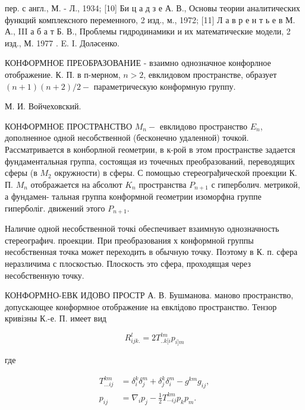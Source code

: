 \documentclass[10pt]{article}
\begin{document}
пер. с англ., М. - Л., 1934; [10] Би ц а д з е А. В., Основы теории аналитических функций комплексного переменного, 2 изд., м., 1972; [11] Л а в р е н т ь е в М. А., III а б а т Б. В., Проблемы гидродинамики и их математические модели, 2 изд., М. 1977 . E. I. Доләсенко.



КОНФОРМНОЕ ПРЕОБРАЗОВАНИЕ - взаимно однозначное конфорлное отображение. К. П. в п-мерном, $n>2$, евклидовом пространстве, образует $(n+1)(n+2) / 2-$ параметрическую конформную группу.



М. И. Войчеховский.



КОНФОРМНОЕ ПРОСТРАНСТВО $M_{n}-$ евклидово пространство $E_{n}$, дополненное одной несобственной (бесконечно удаленной) точкой. Рассматривается в конборлной геометрии, в к-рой в этом пространстве задается фундаментальная группа, состоящая из точечных преобразований, переводящих сферы (в $M_{2}$ окружности) в сферы. С помощью стереограђической проекции К. П. $M_{n}$ отображается на абсолют $K_{n}$ пространства $P_{n+1}$ с гиперболич. метрикой, а фундамен- тальная группа конформной геометрии изоморфна группе гиперболіг. движений этого $P_{n+1}$.



Наличие одной несобственной точкі обеспечивает взаимную однозначность стереографич. проекции. При преобразования х конформной группы несобственная точка может переходить в обычную точку. Поэтому в К. п. сфера неразличима с плоскостью. Плоскость это сфера, проходящая через несобственную точку.



КОНФОРМНО-ЕВК ИДОВО ПРОСТР А. В. Бушманова. маново пространство, допускающее конформное отображение на евклідово пространство. Тензор кривізны К.-е. П. имеет вид



\[

R_{i j k .}^{l}=2 T_{. . k[i}^{l m} p_{i] m}

\]



где



\[

\begin{aligned}

T_{\ldots i j}^{k m} & =\delta_{i}^{k} \delta_{j}^{m}+\delta_{j}^{k} \delta_{i}^{m}-g^{k m} g_{i j}, \\

p_{i j} & =\nabla_{i} p_{j}-\frac{1}{2} T_{\cdots i j}^{k m} p_{k} p_{m} .

\end{aligned}

\]
\end{document}
